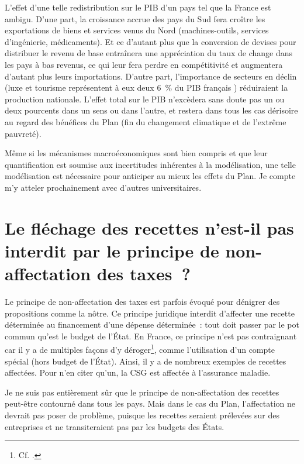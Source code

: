 \documentclass[a5paper,french]{memoir}
\begin{document}
L'effet d'une telle redistribution sur le PIB d'un pays tel que la France est ambigu. D'une part, la croissance accrue des pays du Sud fera croître les exportations de biens et services venus du Nord (machines-outils, services d'ingénierie, médicaments). Et ce d'autant plus que la conversion de devises pour distribuer le revenu de base entraînera une appréciation du taux de change dans les pays à bas revenus, ce qui leur fera perdre en compétitivité et augmentera d'autant plus leurs importations. D'autre part, l'importance de secteurs en déclin (luxe et tourisme représentent à eux deux 6~\% du PIB français%
) réduiraient la production nationale. L'effet total sur le PIB n'excèdera sans doute pas un ou deux pourcents dans un sens ou dans l'autre, et restera dans tous les cas dérisoire au regard des bénéfices du Plan (fin du changement climatique et de l'extrême pauvreté). 

Même si les mécanismes macroéconomiques sont bien compris et que leur quantification est soumise aux incertitudes inhérentes à la modélisation, une telle modélisation est nécessaire pour anticiper au mieux les effets du Plan. Je compte m'y atteler prochainement avec d'autres universitaires.

\section*{\normalsize Le fléchage des recettes n'est-il pas interdit par le principe de non-affectation des taxes~?}\label{q:affectation}

Le principe de non-affectation des taxes est parfois évoqué pour dénigrer des propositions comme la nôtre. Ce principe juridique interdit d'affecter une recette déterminée au financement d'une dépense déterminée~: tout doit passer par le pot commun qu'est le budget de l'État. En France, ce principe n'est pas contraignant car il y a de multiples façons d'y déroger\footnote{Cf. \cite{boutron_contours_2013}.}, comme l'utilisation d'un compte spécial (hors budget de l'État). Ainsi, il y a de nombreux exemples de recettes affectées. Pour n'en citer qu'un, la CSG est affectée à l'assurance maladie. 

Je ne suis pas entièrement sûr que le principe de non-affectation des recettes peut-être contourné dans tous les pays. Mais dans le cas du Plan, l'affectation ne devrait pas poser de problème, puisque les recettes seraient prélevées sur des entreprises et ne transiteraient pas par les budgets des États. 
\end{document}
